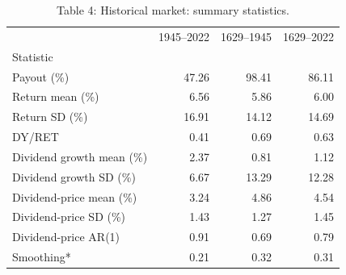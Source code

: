 \begin{table}
\caption{Table 4: Historical market: summary statistics.}
\label{tab:replication_4}
\begin{tabular}{lrrr}
\toprule
 & 1945–2022 & 1629–1945 & 1629–2022 \\
Statistic &  &  &  \\
\midrule
Payout (\%) & 47.26 & 98.41 & 86.11 \\
Return mean (\%) & 6.56 & 5.86 & 6.00 \\
Return SD (\%) & 16.91 & 14.12 & 14.69 \\
DY/RET & 0.41 & 0.69 & 0.63 \\
Dividend growth mean (\%) & 2.37 & 0.81 & 1.12 \\
Dividend growth SD (\%) & 6.67 & 13.29 & 12.28 \\
Dividend-price mean (\%) & 3.24 & 4.86 & 4.54 \\
Dividend-price SD (\%) & 1.43 & 1.27 & 1.45 \\
Dividend-price AR(1) & 0.91 & 0.69 & 0.79 \\
Smoothing* & 0.21 & 0.32 & 0.31 \\
\bottomrule
\end{tabular}
\end{table}
